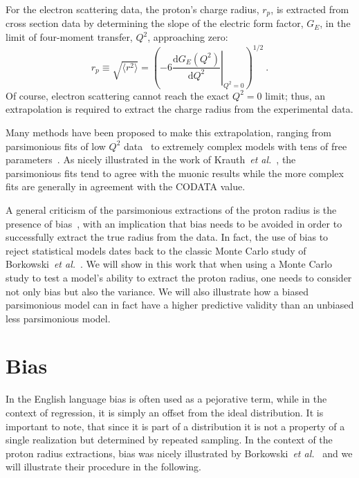 \documentclass[10pt,aps,prc,twocolumn]{revtex4-1}
\begin{document}
For the electron scattering data, the proton's charge radius, $r_p$, is extracted from
cross section data by determining the slope of the electric form factor, $G_E$, in the
limit of four-moment transfer, $Q^2$, approaching zero: 
$$
  r_p \equiv \sqrt{ \langle r^2 \rangle}
   = \left( -6  \left. \frac{\mathrm{d} G_E(Q^2)}{\mathrm{d}Q^2}
    \right|_{Q^{2}=0} \right)^{1/2} \>.
$$
Of course, electron scattering cannot reach the exact $Q^2 = 0$ limit; thus,
an extrapolation is required to extract the charge radius from the experimental data.

Many methods have been proposed to make this extrapolation,
ranging from parsimonious fits of low $Q^2$ data~\cite{Griffioen:2015hta,Horbatsch:2016ilr,Higinbotham:2015rja} 
to extremely complex models with tens of free parameters~\cite{Bernauer:2013tpr,Lee:2015jqa}.   
As nicely illustrated in the work of Krauth~{\it{et al.}}~\cite{Krauth:2017ijq}, the 
parsimonious fits tend to agree with the muonic results while the more complex fits 
are generally in agreement with the CODATA value.

A general criticism of the parsimonious extractions of the proton radius is the presence of bias~\cite{Sick:2017aor},
with an implication that bias needs to be avoided in order to successfully extract the true radius from the data.
In fact, the use of bias to reject statistical models dates back to the classic Monte Carlo 
study of Borkowski~{\it{et al.}}~\cite{Borkowski:1975}. 
We will show in this work that when using a Monte Carlo study to test a model's ability
to extract the proton radius, one needs to consider not only bias but also the variance.
We will also illustrate how a biased parsimonious model can in fact have a higher predictive 
validity than an unbiased less parsimonious model.

\section{Bias}

In the English language bias is often used as a pejorative term, while in the context of regression, it is simply
an offset from the ideal distribution.   It is important to note, that since it is part of a distribution it
is not a property of a single realization but determined by repeated sampling.    In the context of the proton 
radius extractions, bias was nicely illustrated by Borkowski~{\it{et al.}}~\cite{Borkowski:1975} and we will
illustrate their procedure in the following.
\end{document}
